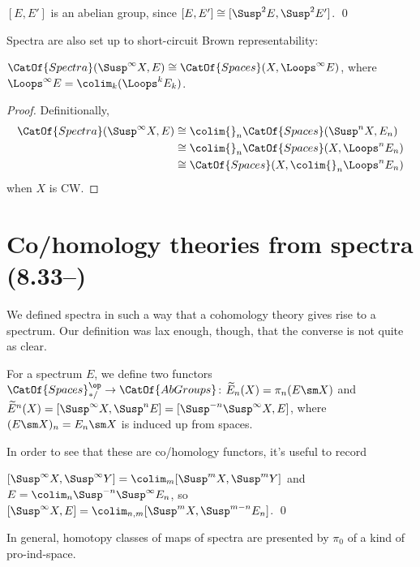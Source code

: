 \begin{corollary}
$[E, E']$ is an abelian group, since $[E, E'] \cong [\Susp^2 E, \Susp^2 E']$. \qed
\end{corollary}

Spectra are also set up to short-circuit Brown representability:

\begin{lemma}
$\CatOf{Spectra}(\Susp^\infty X, E) \cong \CatOf{Spaces}(X, \Loops^\infty E)$, where $\Loops^\infty E = \colim_k (\Loops^k E_k)$.
\end{lemma}
\begin{proof}
Definitionally,
\begin{align*}
\CatOf{Spectra}(\Susp^\infty X, E) & \cong \colim{}_n \CatOf{Spaces}(\Susp^n X, E_n) \\
& \cong \colim{}_n \CatOf{Spaces}(X, \Loops^n E_n) \\
& \cong \CatOf{Spaces}(X, \colim{}_n \Loops^n E_n)
\end{align*}
when $X$ is CW.
\end{proof}




\section{Co/homology theories from spectra (8.33--)}

We defined spectra in such a way that a cohomology theory gives rise to a spectrum.  Our definition was lax enough, though, that the converse is not quite as clear.

\begin{definition}
For a spectrum $E$, we define two functors $\CatOf{Spaces}^{\op}_{*/} \to \CatOf{AbGroups}$: $\widetilde E_n(X) = \pi_n(E \sm X)$ and $\widetilde E^n(X) = [\Susp^\infty X, \Susp^n E] = [\Susp^{-n} \Susp^\infty X, E]$, where $(E \sm X)_n = E_n \sm X$ is induced up from spaces.
\end{definition}

In order to see that these are co/homology functors, it's useful to record
\begin{lemma}
$[\Susp^\infty X, \Susp^\infty Y] = \colim_m [\Susp^m X, \Susp^m Y]$ and $E = \colim_n \Susp^{-n} \Susp^\infty E_n$, so $[\Susp^\infty X, E] = \colim_{n,m} [\Susp^m X, \Susp^{m-n} E_n]$. \qed
\end{lemma}

\begin{remark}
In general, homotopy classes of maps of spectra are presented by $\pi_0$ of a kind of pro-ind-space.
\end{remark}

